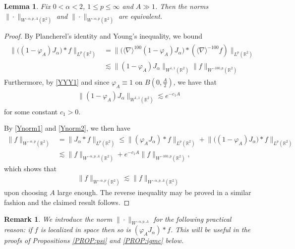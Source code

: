 \documentclass[letterpaper, 11pt,  reqno]{amsart}
\newtheorem{lemma}[theorem]{Lemma}
\theoremstyle{myremark}
\newtheorem{remark}[theorem]{Remark}
\newcommand{\1}{\hspace{0.5mm}\text{I}\hspace{0.5mm}}
\newcommand{\R}{\mathbb{R}}
\newcommand{\al}{\alpha}
\newcommand{\nb}{\nabla}
\newcommand{\les}{\lesssim}
\newcommand{\jb}[1]
{\langle #1 \rangle}
\numberwithin{equation}{section}
\numberwithin{theorem}{section}
\begin{document}
\begin{lemma}\label{LEM:equiv}
Fix $0<\al<2$, $1 \le p \le \infty$ and $A \gg 1$. Then the norms $\|\cdot\|_{W^{-\al,p, A}(\R^2)}$ and $\|\cdot\|_{W^{-\al,p}(\R^2)}$ are equivalent.
\end{lemma}

\begin{proof}
By Plancherel's identity and Young's inequality, we bound
\begin{align}
\begin{split}
 \big\| \big( (1- \varphi_A ) J_{\al}) * f \big\|_{L^p(\R^2)} & =  \big\| \big( \jb \nb ^{100} (1- \varphi_A ) J_{\al}) * (\jb \nb ^{-100} f) \big\|_{L^p(\R^2)} \\
 & \les  \|(1- \varphi_A ) J_{\al}\|_{W^{1,1}(\R^2)} \|f\|_{W^{-100,p}(\R^2)}
\end{split}
\label{Ynorm1}
\end{align}
Furthermore, by \eqref{YYY1} and since $\varphi_A \equiv 1$ on $B(0,\frac A2)$, we have that
\begin{align}
\begin{split}
\|(1- \varphi_A ) J_{\al}\|_{W^{1,1}(\R^2)} \les e^{-c_1 A}
\end{split}
\label{Ynorm2}
\end{align}
for some constant $c_1 >0$.

By \eqref{Ynorm1} and \eqref{Ynorm2}, we then have
\begin{align*}
\| f \|_{W^{-\al,p}(\R^2)} & = \| J_\al * f \|_{L^p(\R^2)} \le \| (\varphi_A J_{\al}) * f \|_{L^p(\R^2)} +  \big\| \big( (1- \varphi_A ) J_{\al}\big) * f \big\|_{L^p(\R^2)} \\
& \les \|f \|_{W^{-\al, p, A}(\R^2)} + e^{-c_1 A} \|f\|_{W^{-100,p}(\R^2)},
\end{align*}
which shows that 
\begin{align*}
\| f \|_{W^{-\al,p}(\R^2)} \les \|f \|_{W^{-\al, p, A}(\R^2)}
\end{align*}
upon choosing $A$ large enough. The reverse inequality may be proved in a similar fashion and the claimed result follows.
\end{proof}

\begin{remark}\rm \label{RMK:equiv}
We introduce the norm $\|\cdot\|_{W^{-\al,p,A}}$ for the following practical reason: if $f$ is localized in space then so is $(\varphi_A J_\al) * f$. This will be useful in the proofs of Propositions \ref{PROP:psi} and \ref{PROP:igmc} below.
\end{remark}
\end{document}
